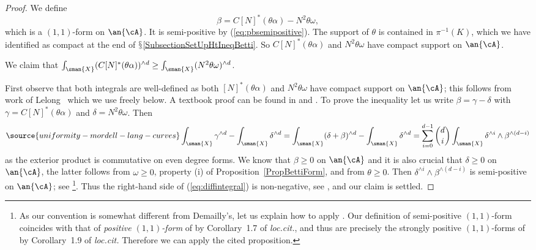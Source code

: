 \begin{proof}
We define
\begin{equation*}
  \beta = C  [N]^*(\theta\alpha) - N^2\theta\omega,
\end{equation*}
which is a  $(1,1)$-form on $\an{\cA}$.
It is semi-positive by (\ref{eq:pbsemipositive}).
The support of $\theta$ is
contained in $\pi^{-1}(K)$, which we have identified as compact at the
end of $\mathsection$\ref{SubsectionSetUpHtIneqBetti}.
So
$C[N]^*(\theta\alpha)$ and $N^2\theta\omega$ have compact support on $\an{\cA}$. %

We claim that  $\int_{\sman{X}} (C[N]^*(\theta\alpha))^{\wedge d} \ge
\int_{\sman{X}} (N^2 \theta\omega)^{\wedge d}$.

First observe that both integrals are well-defined as both
$[N]^*(\theta\alpha)$ and $N^2\theta\omega$ have compact support on
$\an{\cA}$; this follows from work of Lelong~\cite{Lelong} which we
use freely below. A textbook proof can be found in
\cite[Theorem~11.21]{voisin:hodge1} and
\cite[$\mathsection$III.2.B]{Demailly}.
To prove the inequality let us  write $\beta = \gamma - \delta$ with $\gamma = C[N]^*(\theta
\alpha)$ and $\delta = N^2\theta\omega$.
Then
\begin{equation}
\label{eq:diffintegral}
\source{uniformity-mordell-lang-curves}
  \int_{\sman{X}} \gamma^{\wedge d} - \int_{\sman{X}}\delta^{\wedge d}
  =
\int_{\sman{X}} (\delta+\beta)^{\wedge d} - \int_{\sman{X}} \delta^{\wedge
    d}
= \sum_{i=0}^{d-1} {d \choose i} \int_{\sman{X}} \delta^{\wedge
  i}\wedge \beta^{\wedge (d-i)}
\end{equation}
as the exterior product is commutative on even degree forms.
We know that $\beta \ge 0$ on $\an{\cA}$ and it is also crucial that
$\delta \ge 0$ on $\an{\cA}$, the latter
follows from $\omega \ge 0$, property (i) of
Proposition~\ref{PropBettiForm},
and from $\theta\ge 0$.
Then $\delta^{\wedge i}\wedge \beta^{\wedge (d-i)}$ is semi-positive
on $\an{\cA}$; see \cite[Proposition~III.1.11]{Demailly}\footnote{As our convention  is somewhat different from Demailly's, let us explain how to apply  \cite[Proposition~III.1.11]{Demailly}. Our definition of semi-positive $(1,1)$-form coincides with that of \textit{positive $(1,1)$-form} of \cite[Chapter~III]{Demailly} by Corollary~1.7 of \textit{loc.cit.}, and thus are precisely the strongly positive $(1,1)$-forms of \cite[Chapter~III]{Demailly} by Corollary~1.9 of \textit{loc.cit.} Therefore we can apply the cited proposition.}. Thus the right-hand side of (\ref{eq:diffintegral}) is
 non-negative, see \cite[Theorem~III.2.7]{Demailly}, and our claim is settled.


\end{proof}
